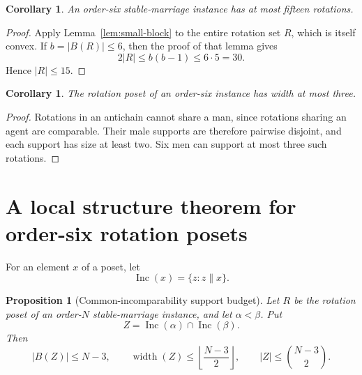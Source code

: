 \documentclass[11pt]{article}
\numberwithin{equation}{section}
\newtheorem{proposition}[theorem]{Proposition}
\newtheorem{corollary}[theorem]{Corollary}
\theoremstyle{definition}
\theoremstyle{remark}
\newcommand{\Inc}{\operatorname{Inc}}
\begin{document}
\begin{corollary}\label{cor:r15}
An order-six stable-marriage instance has at most fifteen rotations.
\end{corollary}

\begin{proof}
Apply Lemma~\ref{lem:small-block} to the entire rotation set $R$, which is
itself convex.  If $b=|B(R)|\le6$, then the proof of that lemma gives
\[
        2|R|\le b(b-1)\le6\cdot5=30.
\]
Hence $|R|\le15$.
\end{proof}

\begin{corollary}\label{cor:width3}
The rotation poset of an order-six instance has width at most three.
\end{corollary}

\begin{proof}
Rotations in an antichain cannot share a man, since rotations sharing an
agent are comparable.  Their male supports are therefore pairwise disjoint,
and each support has size at least two.  Six men can support at most three
such rotations.
\end{proof}

\section{A local structure theorem for order-six rotation posets}

For an element $x$ of a poset, let
\[
        \Inc(x)=\{z:z\parallel x\}.
\]

\begin{proposition}[Common-incomparability support budget]
\label{prop:common-budget}
Let $R$ be the rotation poset of an order-$N$ stable-marriage instance, and
let $\alpha<\beta$.  Put
\[
        Z=\Inc(\alpha)\cap\Inc(\beta).
\]
Then
\[
 |B(Z)|\le N-3,\qquad
 \operatorname{width}(Z)\le
 \left\lfloor\frac{N-3}{2}\right\rfloor,
 \qquad
 |Z|\le\binom{N-3}{2}.
\]
\end{proposition}
\end{document}
